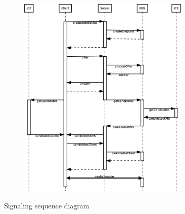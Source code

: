\begin{figure}[!htb]
    \centering
    \begin{subfigure}{}
    	\includegraphics[width=0.9\textwidth]{figures/signaling}
    \end{subfigure}
    \caption{Signaling sequence diagram}
\end{figure} 
